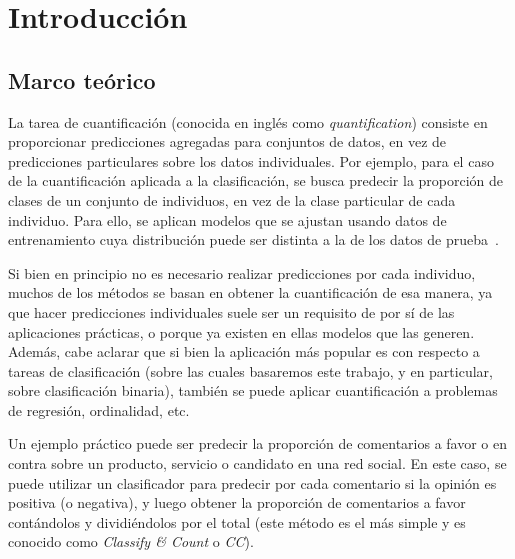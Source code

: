 \chapter{Introducción}\label{introduccion}

\section{Marco teórico}\label{introduccion:marco_teorico}

La tarea de cuantificación (conocida en inglés como {\it quantification\/})
consiste en proporcionar predicciones agregadas para conjuntos de datos, en vez
de predicciones particulares sobre los datos individuales. Por ejemplo, para el
caso de la cuantificación aplicada a la clasificación, se busca predecir la
proporción de clases de un conjunto de individuos, en vez de la clase particular
de cada individuo. Para ello, se aplican modelos que se ajustan usando datos de
entrenamiento cuya distribución puede ser distinta a la de los datos de
prueba~\cite{forman2005counting}.

Si bien en principio no es necesario realizar predicciones por cada individuo,
muchos de los métodos se basan en obtener la cuantificación de esa manera, ya
que hacer predicciones individuales suele ser un requisito de por sí de las
aplicaciones prácticas, o porque ya existen en ellas modelos que las generen.
Además, cabe aclarar que si bien la aplicación más popular es con respecto a
tareas de clasificación (sobre las cuales basaremos este trabajo, y en
particular, sobre clasificación binaria), también se puede aplicar
cuantificación a problemas de regresión, ordinalidad, etc.

Un ejemplo práctico puede ser predecir la proporción de comentarios a favor o en
contra sobre un producto, servicio o candidato en una red social. En este caso,
se puede utilizar un clasificador para predecir por cada comentario si la
opinión es positiva (o negativa), y luego obtener la proporción de comentarios a
favor contándolos y dividiéndolos por el total (este método es el más simple y
es conocido como {\it Classify \& Count\/} o {\it CC\/}).

